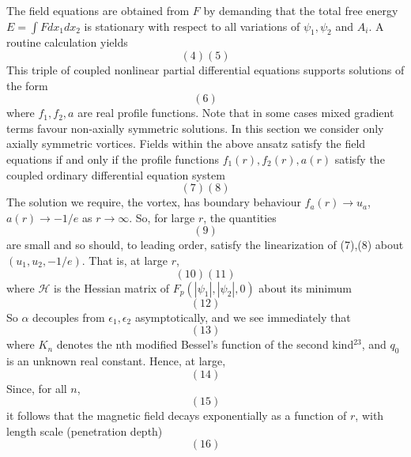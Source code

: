 The field equations are obtained from \( F \) by demanding that the total 
free energy \( E = \int F dx_1 dx_2 \) is stationary with respect to all 
variations of \( \psi_1, \psi_2 \) and \( A_i \). A routine calculation yields 
\begin{equation}
(4)
(5)
\end{equation}
This triple of coupled nonlinear partial differential equations supports 
solutions of the form
\begin{equation}
(6)
\end{equation}
where \( f_1, f_2, a \) are real profile functions. Note that in some cases 
mixed gradient terms favour non-axially symmetric solutions. In this section 
we consider only axially symmetric vortices. Fields within the above ansatz 
satisfy the field equations if and only if the profile functions 
\( f_1(r), f_2(r), a(r) \) satisfy the coupled ordinary differential equation 
system
\begin{equation}
(7)
(8)
\end{equation}
The solution we require, the vortex, has boundary behaviour 
\( f_a(r) \rightarrow u_a \), \( a(r) \rightarrow -1/e \) as 
\( r \rightarrow \infty \). So, for large \( r \), the quantities 
\begin{equation}
(9)
\end{equation}
are small and so should, to leading order, satisfy the linearization of 
(7),(8) about \( (u_1, u_2, -1/e) \). That is, at large \( r \),
\begin{equation}
(10)
(11)
\end{equation}
where \( \mathcal{H} \) is the Hessian matrix of 
\( F_p(|\psi_1|, |\psi_2|, 0) \) about its minimum 
\begin{equation}
(12)
\end{equation}
So \( \alpha \) decouples from \( \epsilon_1, \epsilon_2\) asymptotically, and 
we see immediately that
\begin{equation}
(13)
\end{equation}
where \( K_n \) denotes the nth modified Bessel’s function of the second 
kind\( ^{23} \), and \( q_0 \) is an unknown real constant. Hence, at large,
\begin{equation}
(14)
\end{equation}
Since, for all \( n \), 
\begin{equation}
(15)
\end{equation}
it follows that the magnetic field decays exponentially as a function of 
\( r \), with length scale (penetration depth)
\begin{equation}
(16)
\end{equation}

